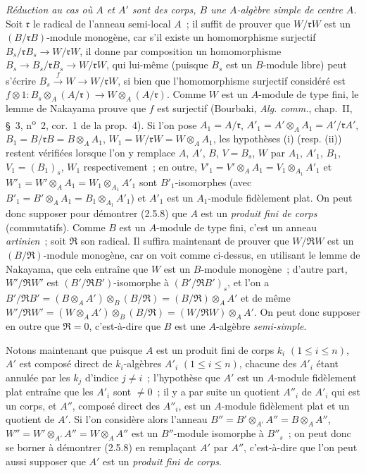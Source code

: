 \begin{env}[2.5.8.8]
\label{IV.2.5.8.8-fr}
\emph{Réduction au cas où $A$ et $A'$ sont des corps, $B$ une $A$-algèbre
simple de centre $A$.} Soit $\mathfrak r$ le radical de l'anneau semi-local
$A$~; il suffit de prouver que $W/\mathfrak rW$ est un
$(B/\mathfrak rB)$-module monogène, car s'il existe un homomorphisme surjectif
$B_s/\mathfrak rB_s\to W/\mathfrak rW$, il donne par composition un
homomorphisme $B_s\to B_s/\mathfrak rB_s\to W/\mathfrak rW$, qui lui-même
(puisque $B_s$ est un $B$-module libre) peut s'écrire
$B_s\xrightarrow{f}W\to W/\mathfrak rW$, si bien que l'homomorphisme
surjectif considéré est $f\otimes1:B_s\otimes_A(A/\mathfrak r)\longrightarrow W\otimes_A(A/\mathfrak r)$. Comme $W$ est un $A$-module de type fini, le lemme de Nakayama prouve que
$f$ est surjectif (Bourbaki, \emph{Alg. comm.}, chap.~II, \S~3,
n\textsuperscript{o}~2, cor.~1 de la prop.~4). Si l'on pose $A_1=A/\mathfrak r$, $A'_1=A'\otimes_A A_1=A'/\mathfrak rA'$, $B_1=B/\mathfrak rB=B\otimes_A A_1$, $W_1=W/\mathfrak rW=W\otimes_A A_1$, les hypothèses (i) (resp. (ii)) restent vérifiées lorsque l'on y remplace
$A$, $A'$, $B$, $V=B_s$, $W$ par $A_1$, $A'_1$, $B_1$,
$V_1=(B_1)_s$, $W_1$ respectivement~; en outre,
$V'_1=V'\otimes_A A_1=V_1\otimes_{A_1}A'_1$ et
$W'_1=W'\otimes_A A_1=W_1\otimes_{A_1}A'_1$ sont $B'_1$-isomorphes (avec
$B'_1=B'\otimes_A A_1=B_1\otimes_{A_1}A'_1$) et $A'_1$ est un $A_1$-module
fidèlement plat. On peut donc supposer pour démontrer (2.5.8) que $A$ est un
\emph{produit fini de corps} (commutatifs). Comme $B$ est un $A$-module de
type fini, c'est un anneau \emph{artinien}~; soit $\mathfrak R$ son radical. Il
suffira maintenant de prouver que $W/\mathfrak RW$ est un
$(B/\mathfrak R)$-module monogène, car on voit comme ci-dessus, en utilisant
le lemme de Nakayama, que cela entraîne que $W$ est un $B$-module monogène~;
d'autre part, $W'/\mathfrak RW'$ est $(B'/\mathfrak RB')$-isomorphe à
$(B'/\mathfrak RB')_s$, et l'on a $B'/\mathfrak RB'=(B\otimes_A A')\otimes_B(B/\mathfrak R)=(B/\mathfrak R)\otimes_A A'$ et de même $W'/\mathfrak RW'=(W\otimes_A A')\otimes_B(B/\mathfrak R)=(W/\mathfrak RW)\otimes_A A'$. On peut donc supposer en outre que $\mathfrak R=0$, c'est-à-dire que $B$ est
une $A$-algèbre \emph{semi-simple}.

Notons maintenant que puisque $A$ est un produit fini de corps $k_i$
$(1\leq i\leq n)$, $A'$ est composé direct de $k_i$-algèbres $A'_i$
$(1\leq i\leq n)$, chacune des $A'_i$ étant annulée par les $k_j$ d'indice
$j\ne i$~; l'hypothèse que $A'$ est un $A$-module fidèlement plat entraîne
que les $A'_i$ sont $\ne0$~; il y a par suite un quotient $A''_i$ de $A'_i$
qui est un corps, et $A''$, composé direct des $A''_i$, est un $A$-module
fidèlement plat et un quotient de $A'$. Si l'on considère alors l'anneau
$B''=B'\otimes_{A'}A''=B\otimes_A A''$,
$W''=W'\otimes_{A'}A''=W\otimes_A A''$ est un $B''$-module isomorphe à
$B''_s$~; on peut donc se borner à démontrer (2.5.8) en remplaçant $A'$ par
$A''$, c'est-à-dire que l'on peut aussi supposer que $A'$ est un \emph{produit
fini de corps}.


\end{env}
